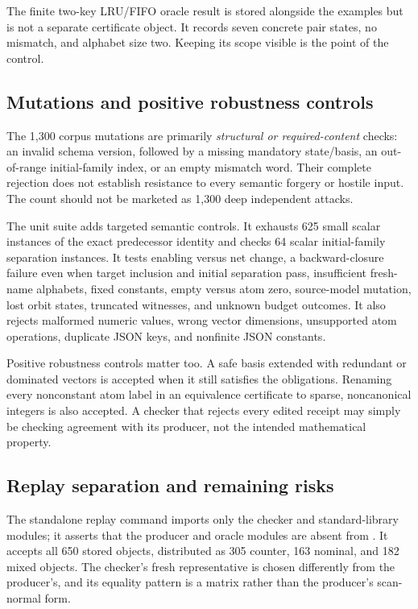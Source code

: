 The finite two-key LRU/FIFO oracle result is stored alongside the examples but
is not a separate certificate object. It records seven concrete pair states,
no mismatch, and alphabet size two. Keeping its scope visible is the point of
the control.

\subsection{Mutations and positive robustness controls}
The 1,300 corpus mutations are primarily \emph{structural or required-content}
checks: an invalid schema version, followed by a missing mandatory state/basis,
an out-of-range initial-family index, or an empty mismatch word. Their complete
rejection does not establish resistance to every semantic forgery or hostile
input. The count should not be marketed as 1,300 deep independent attacks.

The unit suite adds targeted semantic controls. It exhausts 625 small scalar
instances of the exact predecessor identity and checks 64 scalar initial-family
separation instances. It tests enabling versus net change, a backward-closure
failure even when target inclusion and initial separation pass, insufficient
fresh-name alphabets, fixed constants, empty versus atom zero, source-model
mutation, lost orbit states, truncated witnesses, and unknown budget outcomes.
It also rejects malformed numeric values, wrong vector dimensions, unsupported
atom operations, duplicate JSON keys, and nonfinite JSON constants.

Positive robustness controls matter too. A safe basis extended with redundant
or dominated vectors is accepted when it still satisfies the obligations.
Renaming every nonconstant atom label in an equivalence certificate to sparse,
noncanonical integers is also accepted. A checker that rejects every edited
receipt may simply be checking agreement with its producer, not the intended
mathematical property.

\subsection{Replay separation and remaining risks}
The standalone replay command imports only the checker and standard-library
modules; it asserts that the producer and oracle modules are absent from
. It accepts all 650 stored objects, distributed as 305
counter, 163 nominal, and 182 mixed objects. The checker's fresh representative
is chosen differently from the producer's, and its equality pattern is a matrix
rather than the producer's scan-normal form.

